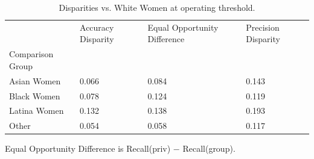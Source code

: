 \begin{table}[htbp]
\centering
\caption{Disparities vs. White Women at operating threshold.}
\label{tab:08-disparities}
\begin{tabular}{llll}
\toprule
 & Accuracy Disparity & Equal Opportunity Difference & Precision Disparity \\
Comparison Group &  &  &  \\
\midrule
Asian Women & 0.066 & 0.084 & 0.143 \\
Black Women & 0.078 & 0.124 & 0.119 \\
Latina Women & 0.132 & 0.138 & 0.193 \\
Other & 0.054 & 0.058 & 0.117 \\
\bottomrule
\end{tabular}

\begin{tablenotes}[flushleft]
\item \small{Equal Opportunity Difference is Recall(priv) − Recall(group).}
\end{tablenotes}
\end{table}
